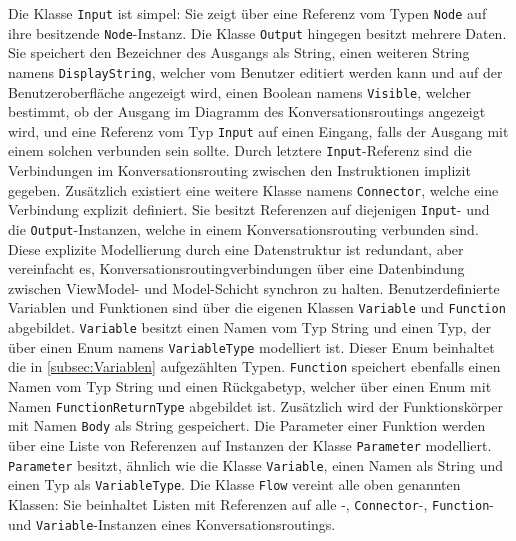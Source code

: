 Die Klasse \texttt{Input} ist simpel: Sie zeigt über eine Referenz vom Typen \texttt{Node} auf ihre besitzende \texttt{Node}-Instanz. Die Klasse \texttt{Output} hingegen besitzt mehrere Daten. Sie speichert den Bezeichner des Ausgangs als String, einen weiteren String namens \texttt{DisplayString}, welcher vom Benutzer editiert werden kann und auf der Benutzeroberfläche angezeigt wird, einen Boolean namens \texttt{Visible}, welcher bestimmt, ob der Ausgang im Diagramm des Konversationsroutings angezeigt wird, und eine Referenz vom Typ \texttt{Input} auf einen Eingang, falls der Ausgang mit einem solchen verbunden sein sollte. Durch letztere \texttt{Input}-Referenz sind die Verbindungen im Konversationsrouting zwischen den Instruktionen implizit gegeben. Zusätzlich existiert eine weitere Klasse namens \texttt{Connector}, welche eine Verbindung explizit definiert. Sie besitzt Referenzen auf diejenigen \texttt{Input}- und die \texttt{Output}-Instanzen, welche in einem Konversationsrouting verbunden sind. Diese explizite Modellierung durch eine Datenstruktur ist redundant, aber vereinfacht es, Kon\-ver\-sa\-tions\-rou\-ting\-ver\-bin\-dung\-en über eine Datenbindung zwischen ViewModel- und Model-Schicht synchron zu halten.
\newline
Benutzerdefinierte Variablen und Funktionen sind über die eigenen Klassen \texttt{Va\-ri\-a\-ble} und \texttt{Function} abgebildet. \texttt{Variable} besitzt einen Namen vom Typ String und einen Typ, der über einen Enum namens \texttt{VariableType} modelliert ist. Dieser Enum beinhaltet die in \ref{subsec:Variablen} aufgezählten Typen. \texttt{Function} speichert ebenfalls einen Namen vom Typ String und einen Rückgabetyp, welcher über einen Enum mit Namen \texttt{FunctionReturnType} abgebildet ist. Zusätzlich wird der Funktionskörper mit Namen \texttt{Body} als String gespeichert. Die Parameter einer Funktion werden über eine Liste von Referenzen auf Instanzen der Klasse \texttt{Parameter} modelliert. \texttt{Parameter} besitzt, ähnlich wie die Klasse \texttt{Variable}, einen Namen als String und einen Typ als \texttt{VariableType}. Die Klasse \texttt{Flow} vereint alle oben genannten Klassen: Sie beinhaltet Listen mit Referenzen auf alle -, \texttt{Connector}-, \texttt{Function}- und \texttt{Variable}-Instanzen eines Konversationsroutings. 



